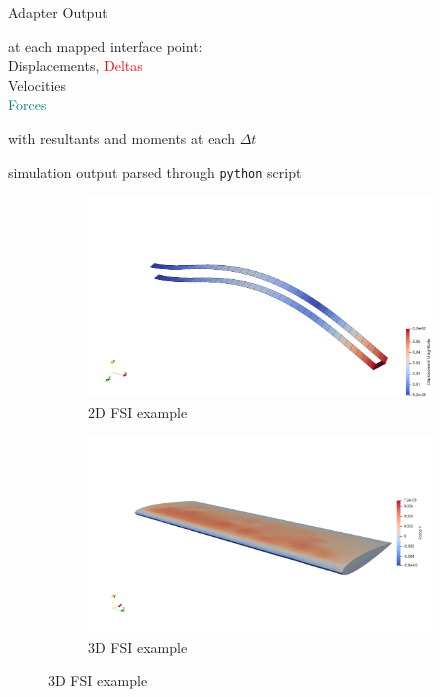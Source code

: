 \documentclass[10pt,t]{beamer}
\begin{document}
\begin{frame}{Adapter Output}

\begin{description}
    \item[*.vtu files] at each mapped interface point: \\
                    \textcolor{dorange}{Displacements}, \textcolor{red}{Deltas}\\ 
                    \textcolor{dblue}{Velocities}\\
                    \textcolor{teal}{Forces}
    \item[csv file] with resultants and moments at each $\Delta t$
    \item[MDByn] simulation output parsed through \texttt{python} script
\end{description}



\begin{figure}
 \begin{subfigure}[t]{.486\textwidth}
    \centering
    \includegraphics[width=\linewidth, trim=20 0 0 200,clip]{images/fsi2_disp.png}
    \caption{2D FSI example}
  \end{subfigure}
  \hfill
  \begin{subfigure}[t]{.486\textwidth}
    \centering
    \includegraphics[width=\linewidth]{images/naca_force.png}
    \caption{3D FSI example}
  \end{subfigure}
\end{figure}


\end{frame}
\end{document}
